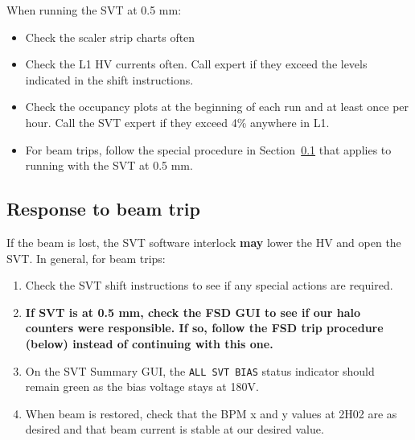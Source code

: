 \documentclass[12pt]{report}
\begin{document}
When running the SVT at 0.5 mm:
\begin{itemize}
\item Check the scaler strip charts often
\item Check the L1 HV currents often.  Call expert if they exceed the levels indicated in the shift instructions.
\item Check the occupancy plots at the beginning of each run and at least once per hour.  Call the SVT expert if they exceed 4\% anywhere in L1.
\item For beam trips, follow the special procedure in Section~\ref{sec:proc_general_beamtrip} that applies to running with the SVT at 0.5 mm.
\end{itemize}

\subsection{Response to beam trip}
\label{sec:proc_general_beamtrip}
If the beam is lost, the SVT software interlock \textbf{may} lower the HV and open the SVT.  In general, for beam trips:
\begin{enumerate}
\item Check the SVT shift instructions to see if any special actions are required.
\item \textbf{If SVT is at 0.5 mm, check the FSD GUI to see if our halo counters were responsible. If so, follow the FSD trip procedure (below) instead of continuing with this one.}
\item On the SVT Summary GUI, the \texttt{ALL SVT BIAS} status indicator should remain green as the bias voltage stays at 180V.
\item When beam is restored, check that the BPM x and y values at 2H02 are as desired and that beam current is stable at our desired value.
\end{enumerate}
\end{document}
